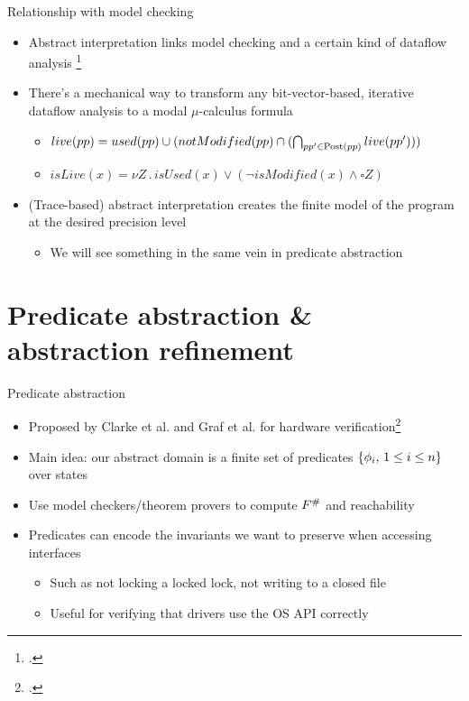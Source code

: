 \documentclass[aspectratio=169]{beamer}
\begin{document}
\begin{frame}{Relationship with model checking}
  \begin{itemize}[<+->]
  \item Abstract interpretation links model
    checking and a certain kind of dataflow analysis
    \footcite{schmidt1998program,schmidt1998data}
  \item There's a mechanical way to transform any bit-vector-based,
    iterative dataflow analysis to a modal $\mu$-calculus formula
    \begin{itemize}
    \item
      $live(pp) = used(pp) \cup (notModified(pp) \cap (\bigcap_{pp' \in
        \mathrm{Post}(pp)} live(pp')))$
      \vspace{.5em}
    \item
      $isLive(x) = \nu Z \,.\, isUsed(x) \vee (\neg isModified(x)
      \wedge \square Z)$
    \end{itemize}
  \item (Trace-based) abstract interpretation creates the finite model of the
    program at the desired precision level
    \begin{itemize}
    \item We will see something in the same vein in predicate abstraction
    \end{itemize}
  \end{itemize}
\end{frame}

\section{Predicate abstraction \& abstraction refinement}

\begin{frame}{Predicate abstraction}
  \begin{itemize}[<+->]
  \item Proposed by Clarke et al. and Graf et al. for hardware verification\footcite{clarke1994model,graf1997construction}
  \item Main idea: our abstract domain is a finite set of predicates $\left\{\phi_i,\, 1 \le i\le n\right\}$ over states
  \item Use model checkers/theorem provers to compute $F^{\#}$ and reachability
  \item Predicates can encode the invariants we want to preserve when accessing interfaces
    \begin{itemize}
    \item Such as not locking a locked lock, not writing to a closed file
    \item Useful for verifying that drivers use the OS API correctly
    \end{itemize}
  \end{itemize}
\end{frame}
\end{document}
